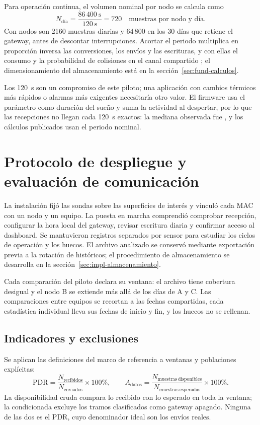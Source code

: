 Para operación continua, el volumen nominal por nodo se calcula como
\begin{equation}
N_{\text{día}}=\frac{86\,400~\mathrm{s}}{120~\mathrm{s}}=720
\quad\text{muestras por nodo y día}.
\label{eq:metodo-muestras-dia}
\end{equation}
Con \NumeroNodos{} nodos son 2160 muestras diarias y 64\,800 en los 30 días que retiene el gateway, antes de descontar interrupciones. Acortar el periodo multiplica en proporción inversa las conversiones, los envíos y las escrituras, y con ellas el consumo y la probabilidad de colisiones en el canal compartido \citep{bor2016}; el dimensionamiento del almacenamiento está en la sección~\ref{sec:fund-calculos}.

Los 120~s son un compromiso de este piloto; una aplicación con cambios térmicos más rápidos o alarmas más exigentes necesitaría otro valor. El firmware usa el parámetro como duración del sueño y suma la actividad al despertar, por lo que las recepciones no llegan cada 120~s exactos: la mediana observada fue \PeriodoMediano{}, y los cálculos publicados usan el periodo nominal.

\section{Protocolo de despliegue y evaluación de comunicación}
\label{sec:metodo-enlace}
La instalación fijó las sondas sobre las superficies de interés y vinculó cada MAC con un nodo y un equipo. La puesta en marcha comprendió comprobar recepción, configurar la hora local del gateway, revisar escritura diaria y confirmar acceso al dashboard. Se mantuvieron registros separados por sensor para estudiar los ciclos de operación y los huecos. El archivo analizado se conservó mediante exportación previa a la rotación de históricos; el procedimiento de almacenamiento se desarrolla en la sección~\ref{sec:impl-almacenamiento}.

Cada comparación del piloto declara su ventana: el archivo tiene cobertura desigual y el nodo B se extiende más allá de los \DuracionComunDias{} días de A y C. Las comparaciones entre equipos se recortan a las fechas compartidas, cada estadística individual lleva sus fechas de inicio y fin, y los huecos no se rellenan.

\subsection{Indicadores y exclusiones}
Se aplican las definiciones del marco de referencia a ventanas y poblaciones explícitas:
\begin{equation}
\mathrm{PDR}=\frac{N_{\mathrm{recibidos}}}{N_{\mathrm{enviados}}}\times100\%,
\qquad
A_{\mathrm{datos}}=\frac{N_{\mathrm{muestras\ disponibles}}}{N_{\mathrm{muestras\ esperadas}}}\times100\%.
\label{eq:metodo-indicadores}
\end{equation}
La disponibilidad cruda compara lo recibido con lo esperado en toda la ventana; la condicionada excluye los tramos clasificados como gateway apagado. Ninguna de las dos es el PDR, cuyo denominador ideal son los envíos reales.

